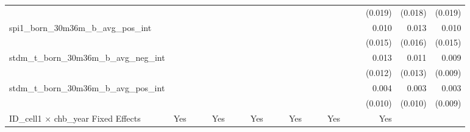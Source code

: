 \begin{tabular}{lrrrrrrrrrrrrrrrrrr}
                                            &              &              &              &              &              &              &              &              &               &              &              &               &              &              &               &      (0.019) &      (0.018) &       (0.019) \\ 
spi1\_born\_30m36m\_b\_avg\_pos\_int        &              &              &              &              &              &              &              &              &               &              &              &               &              &              &               &        0.010 &        0.013 &         0.010 \\ 
                                            &              &              &              &              &              &              &              &              &               &              &              &               &              &              &               &      (0.015) &      (0.016) &       (0.015) \\ 
stdm\_t\_born\_30m36m\_b\_avg\_neg\_int     &              &              &              &              &              &              &              &              &               &              &              &               &              &              &               &        0.013 &        0.011 &         0.009 \\ 
                                            &              &              &              &              &              &              &              &              &               &              &              &               &              &              &               &      (0.012) &      (0.013) &       (0.009) \\ 
stdm\_t\_born\_30m36m\_b\_avg\_pos\_int     &              &              &              &              &              &              &              &              &               &              &              &               &              &              &               &        0.004 &        0.003 &         0.003 \\ 
                                            &              &              &              &              &              &              &              &              &               &              &              &               &              &              &               &      (0.010) &      (0.010) &       (0.009) \\ 
\midrule
ID\_cell1 $\times$ chb\_year Fixed Effects  &          Yes &              &              &          Yes &              &              &          Yes &              &               &          Yes &              &               &          Yes &              &               &          Yes &              &               \\ 

\end{tabular}
